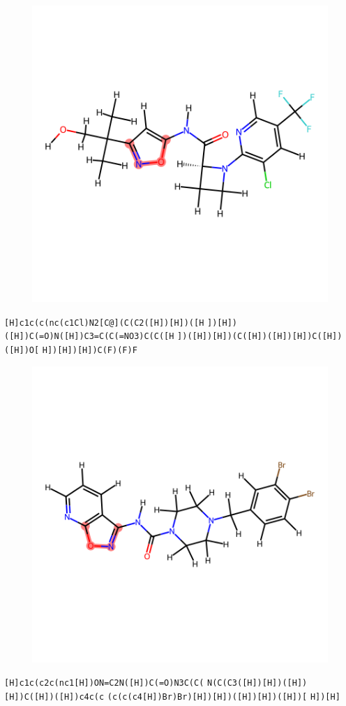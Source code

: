 \documentclass{article}
\begin{document}
\begin{figure}[ht]
\centering
    \includegraphics{mol242.png}
\end{figure}
\verb|[H]c1c(c(nc(c1Cl)N2[C@](C(C2([H])[H])([H| \verb|])[H])([H])C(=O)N([H])C3=C(C(=NO3)C(C([H| \verb|])([H])[H])(C([H])([H])[H])C([H])([H])O[| \verb|H])[H])[H])C(F)(F)F|

\begin{figure}[ht]
\centering
    \includegraphics{mol243.png}
\end{figure}
\verb|[H]c1c(c2c(nc1[H])ON=C2N([H])C(=O)N3C(C(| \verb|N(C(C3([H])[H])([H])[H])C([H])([H])c4c(c| \verb|(c(c(c4[H])Br)Br)[H])[H])([H])[H])([H])[| \verb|H])[H]|
\end{document}
